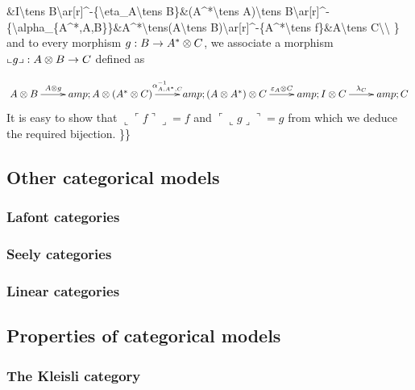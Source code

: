 \&I\textbackslash{}tens
B\textbackslash{}ar{[}r{]}\^{}-\{\textbackslash{}eta\_A\textbackslash{}tens
B\}\&(A\^{}*\textbackslash{}tens A)\textbackslash{}tens
B\textbackslash{}ar{[}r{]}\^{}-\{\textbackslash{}alpha\_\{A\^{}*,A,B\}\}\&A\^{}*\textbackslash{}tens(A\textbackslash{}tens
B)\textbackslash{}ar{[}r{]}\^{}-\{A\^{}*\textbackslash{}tens
f\}\&A\textbackslash{}tens C\textbackslash{}\textbackslash{} \} and to
every morphism \(g:B\to A^*\otimes C\), we associate a morphism
\(\llcorner g\lrcorner:A\otimes B\to C\) defined as

\[\xymatrix{
A\tens B\ar[r]^-{A\tens g}&amp;A\tens(A^*\tens C)\ar[r]^-{\alpha_{A,A^*,C}^{-1}}&amp;(A\tens A^*)\tens C\ar[r]^-{\varepsilon_A\tens C}&amp;I\tens C\ar[r]^-{\lambda_C}&amp;C
}\] It is easy to show that
\(\llcorner \ulcorner f\urcorner\lrcorner=f\) and
\(\ulcorner\llcorner g\lrcorner\urcorner=g\) from which we deduce the
required bijection. \}\}

\subsection{Other categorical models}\label{other-categorical-models}

\subsubsection{Lafont categories}\label{lafont-categories}

\subsubsection{Seely categories}\label{seely-categories}

\subsubsection{Linear categories}\label{linear-categories}

\subsection{Properties of categorical
models}\label{properties-of-categorical-models}

\subsubsection{The Kleisli category}\label{the-kleisli-category}

